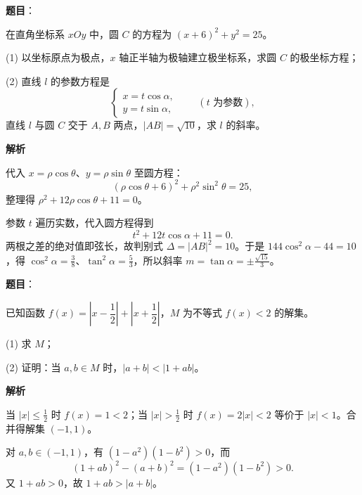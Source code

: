 \begin{answer}

\textbf{题目}：

在直角坐标系 $xOy$ 中，圆 $C$ 的方程为 $(x+6)^2+y^2=25$。

   (1) 以坐标原点为极点，$x$ 轴正半轴为极轴建立极坐标系，求圆 $C$ 的极坐标方程；

   (2) 直线 $l$ 的参数方程是
\nopagebreak[4]
\[
   \begin{cases}
   x=t\cos\alpha,\\
   y=t\sin\alpha,
   \end{cases}\qquad(t\text{ 为参数}),
\]
   直线 $l$ 与圆 $C$ 交于 $A,B$ 两点，$|AB|=\sqrt{10}$，求 $l$ 的斜率。

\textbf{解析}


代入 $x=\rho\cos\theta$、$y=\rho\sin\theta$ 至圆方程：
\nopagebreak[4]
\[
(\rho\cos\theta+6)^2+\rho^2\sin^2\theta=25,
\]
整理得 $\rho^2+12\rho\cos\theta+11=0$。


参数 $t$ 遍历实数，代入圆方程得到
\nopagebreak[4]
\[
t^2+12t\cos\alpha+11=0.
\]
两根之差的绝对值即弦长，故判别式 $\Delta=|AB|^2=10$。于是
$144\cos^2\alpha-44=10$，得 $\cos^2\alpha=\frac38$、$\tan^2\alpha=\frac53$，所以斜率 $m=\tan\alpha=\pm\frac{\sqrt{15}}3$。



\end{answer}
\begin{answer}

\textbf{题目}：

已知函数 $f(x)=\left|x-\dfrac12\right|+\left|x+\dfrac12\right|$，$M$ 为不等式 $f(x)<2$ 的解集。

   (1) 求 $M$；

   (2) 证明：当 $a,b\in M$ 时，$|a+b|<|1+ab|$。

\textbf{解析}


当 $|x|\le\frac12$ 时 $f(x)=1<2$；当 $|x|>\frac12$ 时 $f(x)=2|x|<2$ 等价于 $|x|<1$。合并得解集 $(-1,1)$。


对 $a,b\in(-1,1)$，有 $(1-a^2)(1-b^2)>0$，而
\nopagebreak[4]
\[
(1+ab)^2-(a+b)^2=(1-a^2)(1-b^2)>0.
\]
又 $1+ab>0$，故 $1+ab>|a+b|$。



\end{answer}